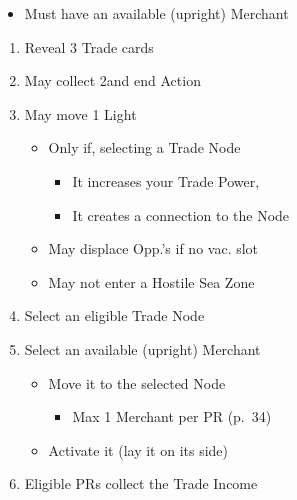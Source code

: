\documentclass[10pt]{article}
\begin{document}
\begin{itemize}
	\item Must have an available (upright) Merchant
\end{itemize}
\begin{enumerate}
	\item Reveal 3 Trade cards
	\item May collect 2\ducats and end Action
	\item May move 1 Light \ship
	\begin{itemize}
		\item Only if, selecting a Trade Node
		\begin{itemize}
			\item It increases your Trade Power, 
			\item It creates a connection to the Node
		\end{itemize}
		\item May displace Opp.'s \ship if no vac. slot
		\item May not enter a Hostile Sea Zone
	\end{itemize}
	\item Select an eligible Trade Node
	\item Select an available (upright) Merchant
	\begin{itemize}
		\item Move it to the selected Node
		\begin{itemize}
			\item Max 1 Merchant per PR (p.~34)
		\end{itemize}
		\item Activate it (lay it on its side)
	\end{itemize}
	\item Eligible PRs collect the Trade Income
\end{enumerate}
\end{document}
